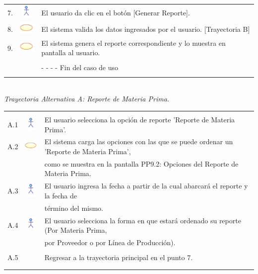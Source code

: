 \documentclass[10pt,spanish]{article}
\providecommand{\tabularnewline}{\\}
\begin{document}
\begin{tabular}{ccl}
	7. & \includegraphics{actor} & El usuario da clic en el botón [Generar Reporte]. \tabularnewline 
	
	8. & \includegraphics{sistema} & El sistema valida los datos ingresados por el usuario. [Trayectoria B] \tabularnewline
	
	9. & \includegraphics{sistema} & El sistema genera el reporte correspondiente y lo muestra en pantalla al usuario. \tabularnewline
	
	
	\tabularnewline
	 &  & - - - - Fin del caso de uso\tabularnewline \\
	\end{tabular}

\newpage
	\textit{\large \\Trayectoria Alternativa A: Reporte de Materia Prima.}
	
	\begin{tabular}{ccl}
	& & \tabularnewline
	
	A.1 & \includegraphics{actor} & El usuario selecciona la opción de reporte 'Reporte de Materia Prima'.\tabularnewline
		
	A.2 & \includegraphics{sistema} & El sistema carga las opciones con las que se puede ordenar un 'Reporte de Materia Prima', \tabularnewline
	& & como se muestra en la pantalla PP9.2: Opciones del Reporte de Materia Prima. \tabularnewline
	
	A.3 & \includegraphics{actor} & El usuario ingresa la fecha a partir de la cual abarcará el reporte y la fecha de \tabularnewline
& &	término del mismo.\tabularnewline

    A.4 & \includegraphics{actor} & El usuario selecciona la forma en que estará ordenado su reporte (Por Materia Prima,  	\tabularnewline
	& &  por Proveedor o por Línea de Producción).\tabularnewline\tabularnewline
	
	A.5 & & Regresar a la trayectoria principal en el punto 7.\tabularnewline

	
	\tabularnewline\tabularnewline	
	\end{tabular}
\end{document}
